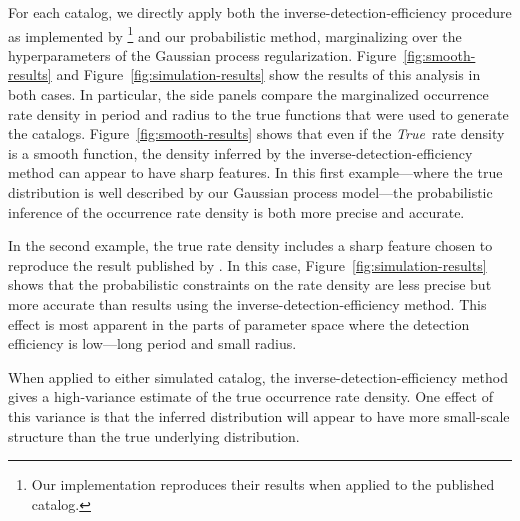 \documentclass[12pt,preprint]{aastex}
\newcommand{\foreign}[1]{\emph{#1}}
\newcommand{\True}{\foreign{True}}
\newcommand{\figref}[1]{\ref{fig:#1}}
\newcommand{\Fig}[1]{Figure~\figref{#1}}
\newcommand{\fig}[1]{\Fig{#1}}
\begin{document}
For each catalog, we directly apply both the inverse-detection-efficiency
procedure as implemented by \citealt{petigura}\footnote{Our implementation
reproduces their results when applied to the published catalog.} and our
probabilistic method, marginalizing over the hyperparameters of the Gaussian
process regularization.
\Fig{smooth-results} and \fig{simulation-results} show the results of this
analysis in both cases.
In particular, the side panels compare the marginalized occurrence rate
density in period and radius to the true functions that were used to
generate the catalogs.
\Fig{smooth-results} shows that even if the \True\ rate density is a smooth
function, the density inferred by the inverse-detection-efficiency method can
appear to have sharp features.
In this first example---where the true distribution is well described by our
Gaussian process model---the probabilistic inference of the occurrence rate
density is both more precise and accurate.

In the second example, the true rate density includes a sharp feature chosen
to reproduce the result published by \citet{petigura}.
In this case, \fig{simulation-results} shows that the probabilistic
constraints on the rate density are less precise but more accurate than
results using the inverse-detection-efficiency method.
This effect is most apparent in the parts of parameter space where the
detection efficiency is low---long period and small radius.

When applied to either simulated catalog, the inverse-detection-efficiency
method gives a high-variance estimate of the true occurrence rate density.
One effect of this variance is that the inferred distribution will appear to
have more small-scale structure than the true underlying distribution.
\end{document}
